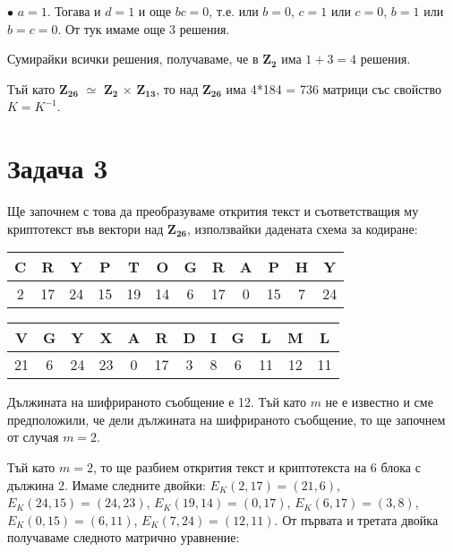 \documentclass{article}
\begin{document}
$\bullet$ $a = 1$. Тогава и $d = 1$ и още $bc = 0$, т.е. или $b = 0$, $c = 1$ или $c = 0$, $b = 1$ или $b = c = 0$. От тук имаме още 3 решения.

\justify
Сумирайки всички решения, получаваме, че в $\mathbf{Z_{2}}$ има $1 + 3 = 4$ решения.

\justify
Тъй като $\mathbf{Z_{26}}$ $\simeq$ $\mathbf{Z_2}$ $\times$ $\mathbf{Z_{13}}$, то над $\mathbf{Z_{26}}$ има 4*184 = 736 матрици със свойство $K = K^{-1}$.

\section*{Задача 3}

\justify
Ще започнем с това да преобразуваме открития текст и съответстващия му криптотекст във вектори над $\mathbf{Z_{26}}$, използвайки дадената схема за кодиране:

\begin{center}
\begin{tabular}{|c|c|c|c|c|c|c|c|c|c|c|c|}
        \hline
        C & R & Y & P & T & O & G & R & A & P & H & Y \\
        \hline
        2 & 17 & 24 & 15 & 19 & 14 & 6 & 17 & 0 & 15 & 7 & 24 \\
        \hline
        \end{tabular}
\end{center}

\begin{center}
\begin{tabular}{|c|c|c|c|c|c|c|c|c|c|c|c|}
        \hline
        V & G & Y & X & A & R & D & I & G & L & M & L \\
        \hline
        21 & 6 & 24 & 23 & 0 & 17 & 3 & 8 & 6 & 11 & 12 & 11 \\
        \hline
        \end{tabular}
\end{center}

\justify
Дължината на шифрираното съобщение е 12. Тъй като $m$ не е известно и сме предположили, че дели дължината на шифрираното съобщение, то ще започнем от случая $m = 2$. 

\justify
Тъй като $m = 2$, то ще разбием открития текст и криптотекста на 6 блока с дължина 2. Имаме следните двойки: $E_K(2,17) = (21,6)$, $E_K(24,15) = (24,23)$, $E_K(19,14) = (0,17)$, $E_K(6,17) = (3,8)$, $E_K(0,15) = (6,11)$, $E_K(7,24) = (12,11)$. От първата и третата двойка получаваме следното матрично уравнение: \\
\end{document}

